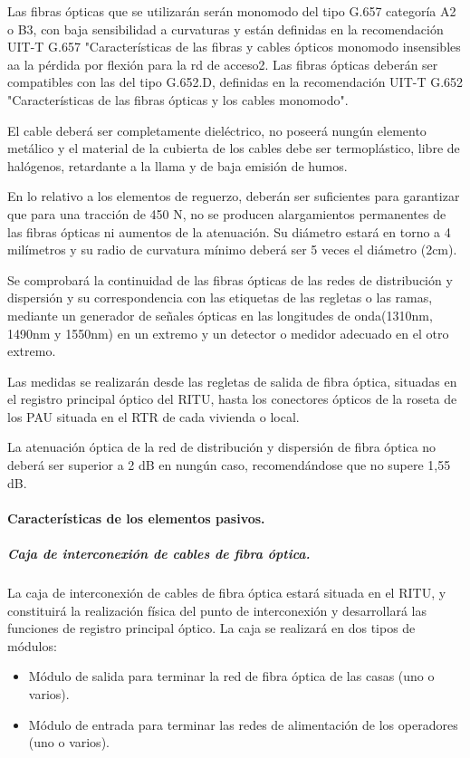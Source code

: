 Las fibras ópticas que se utilizarán serán monomodo del tipo G.657 categoría A2 o B3, con baja sensibilidad a curvaturas y están definidas en la recomendación UIT-T G.657 "Características de las fibras y cables ópticos monomodo insensibles aa la pérdida por flexión para la rd de acceso2. Las fibras ópticas deberán ser compatibles con las del tipo G.652.D, definidas en la recomendación UIT-T G.652 "Características de las fibras ópticas y los cables monomodo".

El cable deberá ser completamente dieléctrico, no poseerá nungún elemento metálico y el material de la cubierta de los cables debe ser termoplástico, libre de halógenos, retardante a la llama y de baja emisión de humos.

En lo relativo a los elementos de reguerzo, deberán ser suficientes para garantizar que para una tracción de 450 N, no se producen alargamientos permanentes de las fibras ópticas ni aumentos de la atenuación. Su diámetro estará en torno a 4 milímetros y su radio de curvatura mínimo deberá ser 5 veces el diámetro (2cm).

Se comprobará la continuidad de las fibras ópticas de las redes de distribución y dispersión y su correspondencia con las etiquetas de las regletas o las ramas, mediante un generador de señales ópticas en las longitudes de onda(1310nm, 1490nm y 1550nm) en un extremo y un detector o medidor adecuado en el otro extremo.

Las medidas se realizarán desde las regletas de salida de fibra óptica, situadas en el registro principal óptico del RITU, hasta los conectores ópticos de la roseta de los PAU situada en el RTR de cada vivienda o local.

La atenuación óptica de la red de distribución y dispersión de fibra óptica no deberá ser superior a 2 dB en nungún caso, recomendándose que no supere 1,55 dB.
\paragraph{Características de los elementos pasivos.}
\subparagraph{Caja de interconexión de cables de fibra óptica.}
La caja de interconexión de cables de fibra óptica estará situada en el RITU, y constituirá la realización física del punto de interconexión y desarrollará las funciones de registro principal óptico. La caja se realizará en dos tipos de módulos:
\begin{itemize} 
	\item Módulo de salida para terminar la red de fibra óptica de las casas (uno o varios).
	\item Módulo de entrada para terminar las redes de alimentación de los operadores (uno o varios).
\end{itemize}

